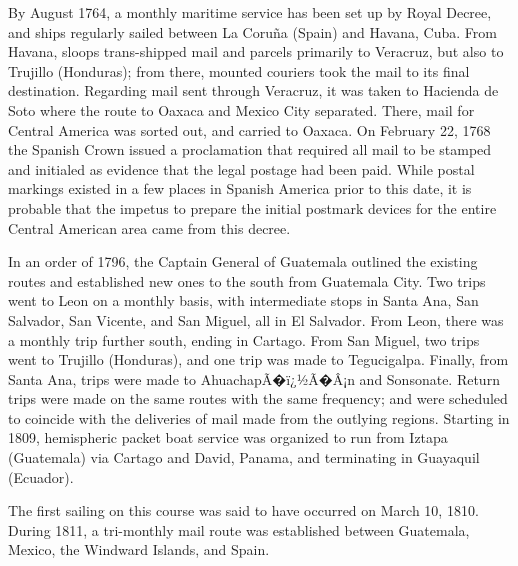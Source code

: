 By August 1764, a monthly maritime service has been set up by Royal Decree, and ships regularly sailed between La Coru\~na (Spain) and Havana, Cuba. From Havana, sloops trans-shipped mail and parcels primarily to Veracruz, but also to Trujillo (Honduras); from there, mounted couriers took the mail to its final destination. Regarding mail sent through Veracruz, it was taken to Hacienda de Soto where the route to Oaxaca and Mexico City separated. There, mail for Central America was sorted out, and carried to Oaxaca. On February 22, 1768 the Spanish Crown issued a proclamation that required all mail to be stamped and initialed as evidence that the legal postage had been paid. While postal markings existed in a few places in Spanish America prior to this date, it is probable that the impetus to prepare the initial postmark devices for the entire Central American area came from this decree.

In an order of 1796, the Captain General of Guatemala outlined the existing routes and established new ones to the south from Guatemala City. Two trips went to Leon on a monthly basis, with intermediate stops in Santa Ana, San Salvador, San Vicente, and San Miguel, all in El Salvador. From Leon, there was a monthly trip further south, ending in Cartago. From San Miguel, two trips went to Trujillo (Honduras), and one trip was made to Tegucigalpa. Finally, from Santa Ana, trips were made to AhuachapÃ�ï¿½Ã�Â¡n and Sonsonate. Return trips were made on the same routes with the same frequency; and were scheduled to coincide with the deliveries of mail made from the outlying regions.
Starting in 1809, hemispheric packet boat service was organized to run from Iztapa (Guatemala) via Cartago and David, Panama, and terminating in Guayaquil (Ecuador). 

The first sailing on this course was said to have occurred on March 10, 1810. During 1811, a tri-monthly mail route was established between Guatemala, Mexico, the Windward Islands, and Spain.      

